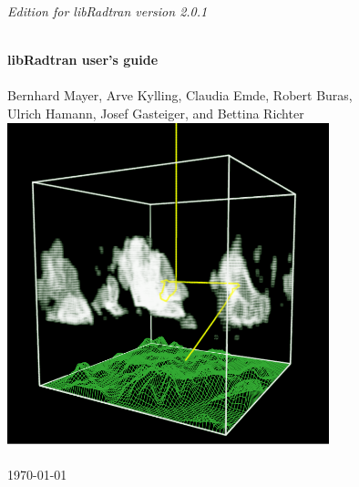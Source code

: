 \begin{titlepage}
 
\begin{center}
 
  \begin{flushright}
    {\sl \large Edition for libRadtran version 2.0.1}
  \end{flushright}
  \vspace*{2cm}
  
  \HRule \\[0.8cm]
  { \huge \bfseries libRadtran user's guide}\\[0.4cm]
  \HRule \\[1.5cm]
  
  \Large{Bernhard Mayer, Arve Kylling, Claudia Emde, Robert Buras, \\
    Ulrich Hamann, Josef Gasteiger, and Bettina Richter} \\[2cm]
  
  \includegraphics[width=0.7\textwidth]{figs/mystic2.png}\\

  \vfill
  
  {\large \today}
  
\end{center}

\end{titlepage}
